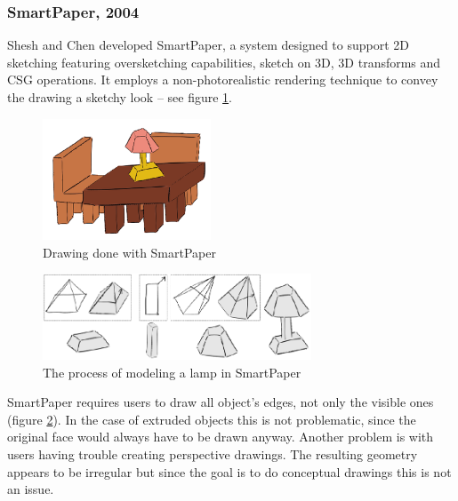 \subsubsection{SmartPaper, 2004}

Shesh and Chen \cite{SMARTPAPER} developed SmartPaper, a system designed to support
2D sketching featuring oversketching capabilities, sketch on 3D, 3D transforms and
CSG operations. It employs a non-photorealistic rendering technique to convey the
drawing a sketchy look -- see figure \ref{FIG-SMARTPAPER}.

\begin{figure}[!ht]
	\centering
	\includegraphics[width=5cm]{gfx/smartpaper.png}
	\caption{Drawing done with SmartPaper}
	\label{FIG-SMARTPAPER}
\end{figure}

\begin{figure}[!ht]
	\centering
	\includegraphics[width=8cm]{gfx/smartpaper2.png}
	\caption{The process of modeling a lamp in SmartPaper}
	\label{FIG-SMARTPAPER2}
\end{figure}


SmartPaper requires users to draw all object's edges, not only the visible ones (figure \ref{FIG-SMARTPAPER2}).
In the case of extruded objects this is not problematic, since the original face would always have to be drawn anyway.
Another problem is with users having trouble creating perspective drawings.
The resulting geometry appears to be irregular but since the goal is to do
conceptual drawings this is not an issue.

